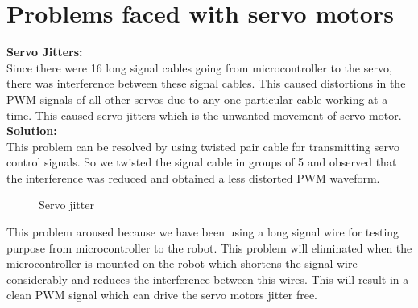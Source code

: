 \documentclass[12pt]{article}
\begin{document}
 \section{Problems faced with servo motors}
 \textbf{Servo Jitters:}\\
 Since there were 16 long signal cables going from microcontroller to the servo, there was
 interference between these signal cables. This caused distortions in the PWM signals of all
 other servos due to any one particular cable working at a time. This caused servo jitters
 which is the unwanted movement of servo motor.\\
 \textbf{Solution:}\\
 This problem can be resolved by using twisted pair cable for transmitting servo control
 signals. So we twisted the signal cable in groups of 5 and observed that the interference
 was reduced and obtained a less distorted PWM waveform.
 \newpage
 \begin{figure}[h!]
 	
 	\centering
 	\hspace{2cm}
 	\newline
 	
 	\caption{Servo jitter}
 \end{figure}
 This problem aroused because we have been using a long signal wire for testing purpose
 from microcontroller to the robot. This problem will eliminated when the microcontroller
 is mounted on the robot which shortens the signal wire considerably and reduces the
 interference between this wires. This will result in a clean PWM signal which can drive the
 servo motors jitter free.\\
 
\end{document}
